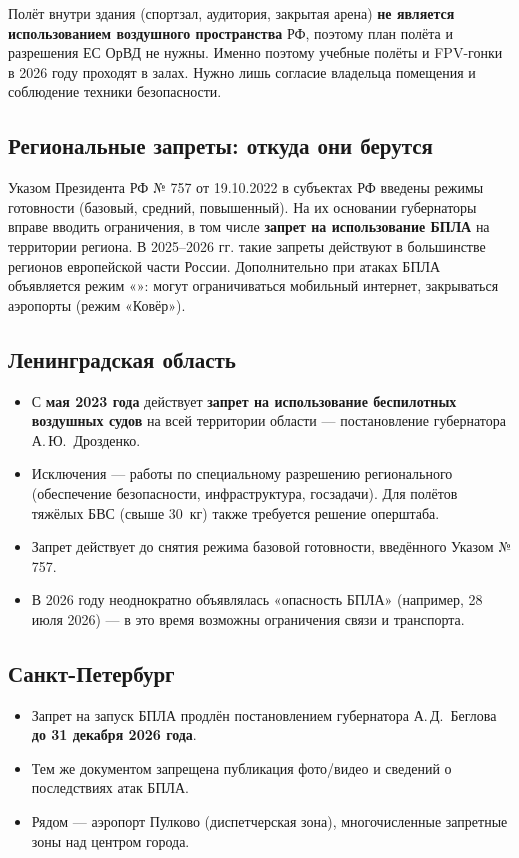 \begin{keybox}
Полёт внутри здания (спортзал, аудитория, закрытая арена) \textbf{не является использованием воздушного пространства} РФ, поэтому план полёта и разрешения ЕС ОрВД не нужны. Именно поэтому учебные полёты и FPV-гонки в 2026 году проходят в залах. Нужно лишь согласие владельца помещения и соблюдение техники безопасности.
\end{keybox}

\subsection{Региональные запреты: откуда они берутся}
Указом Президента РФ № 757 от 19.10.2022 в субъектах РФ введены режимы готовности (базовый, средний, повышенный). На их основании губернаторы вправе вводить ограничения, в том числе \textbf{запрет на использование БПЛА} на территории региона. В 2025–2026 гг. такие запреты действуют в большинстве регионов европейской части России. Дополнительно при атаках БПЛА объявляется режим «»: могут ограничиваться мобильный интернет, закрываться аэропорты (режим «Ковёр»).

\subsection{Ленинградская область}
\begin{itemize}
\item С \textbf{мая 2023 года} действует \textbf{запрет на использование беспилотных воздушных судов} на всей территории области — постановление губернатора А.\,Ю.~Дрозденко.
\item Исключения — работы по специальному разрешению регионального  (обеспечение безопасности, инфраструктура, госзадачи). Для полётов тяжёлых БВС (свыше 30~кг) также требуется решение оперштаба.
\item Запрет действует до снятия режима базовой готовности, введённого Указом № 757.
\item В 2026 году неоднократно объявлялась «опасность БПЛА» (например, 28 июля 2026) — в это время возможны ограничения связи и транспорта.
\end{itemize}

\subsection{Санкт-Петербург}
\begin{itemize}
\item Запрет на запуск БПЛА продлён постановлением губернатора А.\,Д.~Беглова \textbf{до 31 декабря 2026 года}.
\item Тем же документом запрещена публикация фото/видео и сведений о последствиях атак БПЛА.
\item Рядом — аэропорт Пулково (диспетчерская зона), многочисленные запретные зоны над центром города.
\end{itemize}

